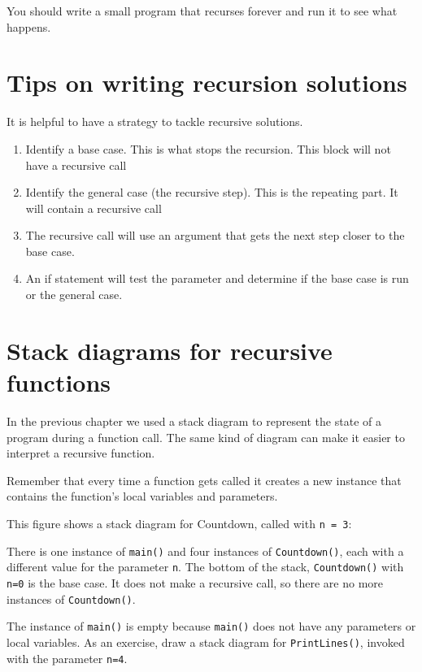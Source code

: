 You should write a small program that recurses forever and run
it to see what happens.

\section {Tips on writing recursion solutions}
It is helpful to have a strategy to tackle recursive solutions. 
\begin{enumerate}
	\item Identify a base case. This is what stops the recursion. This block will not have a recursive call
	\item Identify the general case (the recursive step). This is the repeating part. It will contain a recursive call
	\item The recursive call will use an argument that gets the next step closer to the base case.
	\item An if statement will test the parameter and determine if the base case is run or the general case.
\end{enumerate}

\section {Stack diagrams for recursive functions}

In the previous chapter we used a stack diagram to represent the
state of a program during a function call.  The same kind
of diagram can make it easier to interpret a recursive function.

Remember that every time a function gets called it creates
a new instance that contains
the function's local variables and parameters.

This figure shows a stack diagram for Countdown, called
with {\tt n = 3}:

\vspace{0.1in}
\centerline{}
\vspace{0.1in}
%
There is one instance of {\tt main()} and four instances of
{\tt Countdown()}, each with a different value for the parameter
{\tt n}.  The bottom of the stack, {\tt Countdown()} with {\tt n=0}
is the base case.  It does not make a recursive call, so there
are no more instances of {\tt Countdown()}.

The instance of {\tt main()} is empty because {\tt main()} does not
have any parameters or local variables.  As an exercise, draw a
stack diagram for {\tt PrintLines()}, invoked with the parameter {\tt n=4}.


